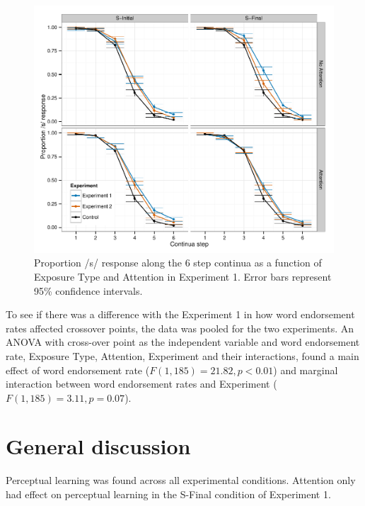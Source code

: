 \begin{figure}[!ht]
\caption{Proportion /s/ response along the 6 step continua as a function of Exposure Type and Attention in Experiment 1. Error bars represent 95\% confidence intervals.}
\label{fig:exp12categ}
\begin{center}
\includegraphics[width=\textwidth]{graphs/exp12_categresults}
\end{center}
\end{figure}

To see if there was a difference with the Experiment 1 in how word endorsement rates affected crossover points, the data was pooled for the two experiments.  An ANOVA with cross-over point as the independent variable and word endorsement rate, Exposure Type, Attention, Experiment and their interactions, found a main effect of word endorsement rate ($F(1,185) = 21.82, p < 0.01$) and marginal interaction between word endorsement rates and Experiment ($F(1, 185) = 3.11, p = 0.07$).

\section{General discussion}

Perceptual learning was found across all experimental conditions. Attention only had effect on perceptual learning in the S-Final condition of Experiment 1.  

